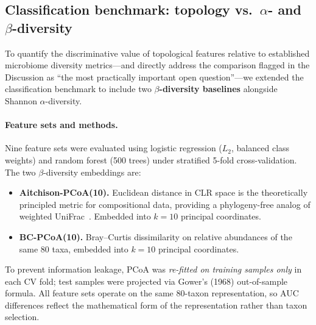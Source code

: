 \subsection{Classification benchmark: topology vs.\ $\alpha$- and $\beta$-diversity}
\label{subsec:classification}

To quantify the discriminative value of topological features relative to
established microbiome diversity metrics---and directly address the comparison
flagged in the Discussion as ``the most practically important open question''---we
extended the classification benchmark to include two \textbf{$\beta$-diversity
baselines} alongside Shannon $\alpha$-diversity.

\paragraph{Feature sets and methods.}
Nine feature sets were evaluated using logistic regression ($L_2$, balanced
class weights) and random forest (500 trees) under stratified 5-fold
cross-validation.
The two $\beta$-diversity embeddings are:
\begin{itemize}[leftmargin=*, itemsep=1pt]
  \item \textbf{Aitchison-PCoA(10).}
  Euclidean distance in CLR space is the theoretically principled metric for
  compositional data, providing a phylogeny-free analog of weighted
  UniFrac~\citep{aitchison1982statistical}.
  Embedded into $k = 10$ principal coordinates.
  \item \textbf{BC-PCoA(10).}
  Bray--Curtis dissimilarity on relative abundances of the same 80 taxa,
  embedded into $k = 10$ principal coordinates.
\end{itemize}
To prevent information leakage, PCoA was \emph{re-fitted on training samples
only} in each CV fold; test samples were projected via Gower's (1968)
out-of-sample formula.
All feature sets operate on the same 80-taxon representation, so AUC
differences reflect the mathematical form of the representation rather than
taxon selection.

